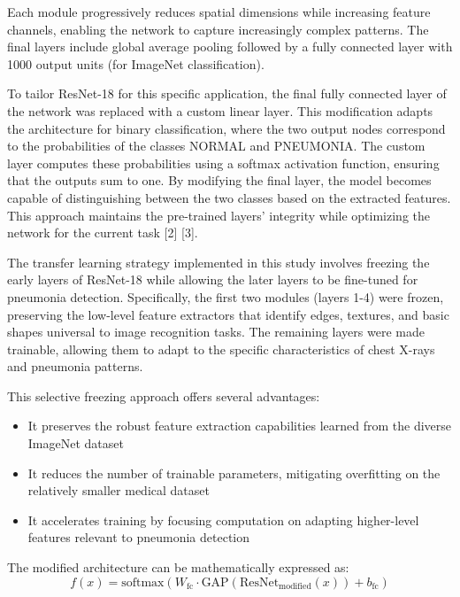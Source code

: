 \documentclass[
  twocolumn,
  10pt,
  a4paper,
  journal
]{IEEEtran}
\begin{document}
Each module progressively reduces spatial dimensions while increasing feature channels, enabling the network to capture increasingly complex patterns. The final layers include global average pooling followed by a fully connected layer with 1000 output units (for ImageNet classification).

To tailor ResNet-18 for this specific application, the final fully connected layer of the network was replaced with a custom linear layer. This modification adapts the architecture for binary classification, where the two output nodes correspond to the probabilities of the classes NORMAL and PNEUMONIA. The custom layer computes these probabilities using a softmax activation function, ensuring that the outputs sum to one. By modifying the final layer, the model becomes capable of distinguishing between the two classes based on the extracted features. This approach maintains the pre-trained layers' integrity while optimizing the network for the current task {[}2{]} {[}3{]}.

The transfer learning strategy implemented in this study involves freezing the early layers of ResNet-18 while allowing the later layers to be fine-tuned for pneumonia detection. Specifically, the first two modules (layers 1-4) were frozen, preserving the low-level feature extractors that identify edges, textures, and basic shapes universal to image recognition tasks. The remaining layers were made trainable, allowing them to adapt to the specific characteristics of chest X-rays and pneumonia patterns.

This selective freezing approach offers several advantages:

\begin{itemize}
\item It preserves the robust feature extraction capabilities learned from the diverse ImageNet dataset
\item It reduces the number of trainable parameters, mitigating overfitting on the relatively smaller medical dataset
\item It accelerates training by focusing computation on adapting higher-level features relevant to pneumonia detection
\end{itemize}

The modified architecture can be mathematically expressed as:
\begin{equation}
f(x) = \text{softmax}(W_{\text{fc}} \cdot \text{GAP}(\text{ResNet}_{\text{modified}}(x)) + b_{\text{fc}})
\end{equation}
\end{document}
